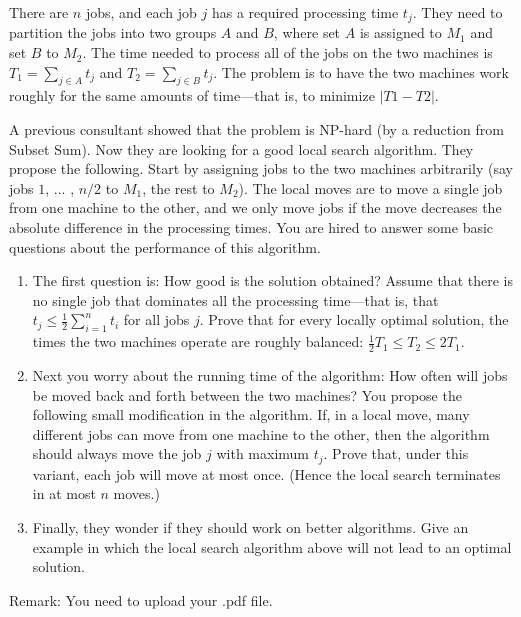\documentclass{article}
\begin{document}
\begin{enumerate}
There are $n$ jobs, and each job $j$ has a required processing time $t_j$. They need to partition the jobs into two groups $A$ and $B$, where set $A$ is assigned to $M_1$ and set $B$ to $M_2$. The time needed to process all of the jobs on the two machines is $T_1 = \sum_{j \in A} t_j$ and $T_2 = \sum_{j \in B} t_j$. The problem is to have the two machines work roughly for the same amounts of time—that is, to minimize $\left | T1 - T2 \right |$.

A previous consultant showed that the problem is NP-hard (by a reduction from Subset Sum). Now they are looking for a good local search algorithm. They propose the following. Start by assigning jobs to the two machines arbitrarily (say jobs $1$, ... , $n/2$ to $M_1$, the rest to $M_2$). The local moves are to move a single job from one machine to the other, and we only move jobs if the move decreases the absolute difference in the processing times. You are hired to answer some basic questions about the performance of this algorithm.

\begin{enumerate}
    \item The first question is: How good is the solution obtained? Assume that there is no single job that dominates all the processing time—that is, that $t_j \leqslant  \frac{1}{2} \sum_{i=1}^n t_i$ for all jobs $j$. Prove that for every locally  optimal solution, the times the two machines operate are roughly balanced: $\frac{1}{2}T_1 \leqslant T_2 \leqslant 2T_1$.
    \item Next you worry about the running time of the algorithm: How often will jobs be moved back and forth between the two machines? You propose the following small modification in the algorithm. If, in a local move, many different jobs can move from one machine to the other, then the algorithm should always move the job $j$ with maximum $t_j$. Prove that, under this variant, each job will move at most once. (Hence the local search terminates in at most $n$ moves.)
    \item Finally, they wonder if they should work on better algorithms. Give an example in which the local search algorithm above will not lead to an optimal solution.
\end{enumerate}

\end{enumerate}

Remark: You need to upload your .pdf file.
\end{document}
